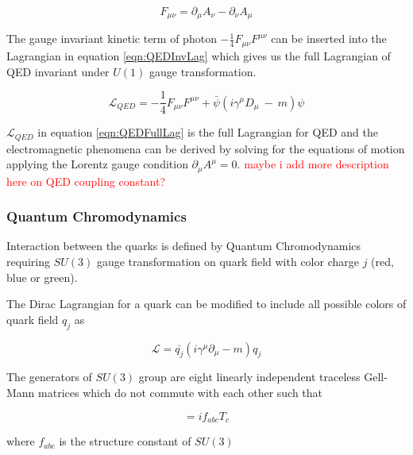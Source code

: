 \begin{equation}
F_{\mu\nu} = \partial_{\mu}A_{\nu} - \partial_{\nu}A_{\mu}
\label{QEDFieldTensor}
\end{equation}

The gauge invariant kinetic term of photon $-\frac{1}{4}F_{\mu\nu}F^{\mu\nu}$ can be inserted into the Lagrangian in equation \ref{eqn:QEDInvLag} which gives us the full Lagrangian of QED invariant under $U(1)$ gauge transformation. 

\begin{equation}
\mathcal{L}_{QED} = -\frac{1}{4}F_{\mu\nu}F^{\mu\nu} + \bar{\psi} ( i \gamma^{\mu} D_{\mu} ~-~ m) \psi
\label{eqn:QEDFullLag}
\end{equation}

$\mathcal{L}_{QED}$ in equation \ref{eqn:QEDFullLag} is the full Lagrangian for QED and the electromagnetic phenomena can be derived by solving for the equations of motion applying the Lorentz gauge condition $\partial_{\mu}A^{\mu}=0$. 
\textcolor{red}{maybe i add more description here on QED coupling constant?}


\subsubsection{Quantum Chromodynamics }
\label{subsubsec:QCD}

Interaction between the quarks is defined by Quantum Chromodynamics requiring $SU(3)$ gauge transformation on quark field with color charge $j$ (red, blue or green).
 
The Dirac Lagrangian for a quark can be modified to include all possible colors of quark field $q_{j}$ as

\begin{equation}
\mathcal{L} = \bar{q_{j}}(i\gamma^{\mu}\partial_{\mu} - m )q_{j}
\label{eqn:QCDStartL}
\end{equation}

The generators of $SU(3)$ group are eight linearly independent traceless Gell-Mann matrices which do not commute with each other such that 

\begin{equation}
[ T_{a},T_{b} ] = if_{abc}T_{c}
\label{eqn:SU3GellManMat}
\end{equation}

where $f_{abc}$ is the structure constant of $SU(3)$

